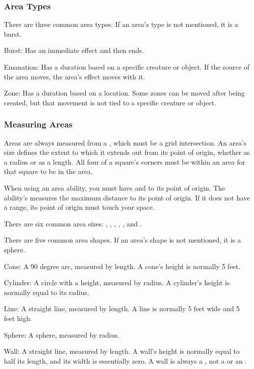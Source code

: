     \subsubsection{Area Types}
      There are three common area types.
      If an area's type is not mentioned, it is a burst.
      \begin{raggeditemize}
        \item Burst: Has an immediate effect and then ends.
        \item Emanation: Has a duration based on a specific creature or object. If the source of the area moves, the area's effect moves with it.
        \item Zone: Has a duration based on a location. Some zones can be moved after being created, but that movement is not tied to a specific creature or object.
      \end{raggeditemize}

    \subsubsection{Measuring Areas}
      Areas are always measured from a , which must be a grid intersection.
      An area's size defines the extent to which it extends out from its point of origin, whether as a radius or as a length.
      All four of a square's corners must be within an area for that square to be in the area.

      When using an area ability, you must have  and  to its point of origin.
      The ability's  measures the maximum distance to its point of origin.
      If it does not have a range, its point of origin must touch your space.

      There are six common area sizes: \tinyarea, \smallarea, \medarea, \largearea, \hugearea, and \gargarea.

      There are five common area shapes.
      If an area's shape is not mentioned, it is a sphere.
      \begin{raggeditemize}
        \item Cone: A 90 degree arc, measured by length. A cone's height is normally 5 feet.
        \item Cylinder: A circle with a height, measured by radius. A cylinder's height is normally equal to its radius.
        \item Line: A straight line, measured by length. A line is normally 5 feet wide and 5 feet high.
        \item Sphere: A sphere, measured by radius.
        \item Wall: A straight line, measured by length. A wall's height is normally equal to half its length, and its width is essentially zero. A wall is always a , not a  or an .
      \end{raggeditemize}

